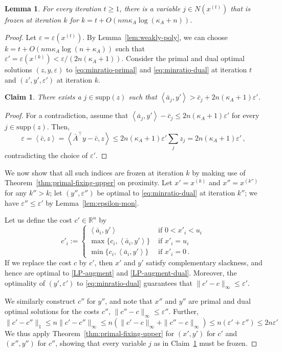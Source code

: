 \documentclass[11pt, a4paper]{article}
\newcommand{\pr}[2]{\left\langle #1, #2 \right\rangle}
\newcommand{\supp}{\mathrm{supp}}
\newcommand{\1}{\mathbbm{1}}
\newtheorem{lemma}[theorem]{Lemma}
\newtheorem{claim}{Claim}[theorem]
\theoremstyle{case}
\newcommand{\R}{\mathbb{R}}
\begin{document}
\begin{lemma}
For every iteration $t\ge 1$, there is a variable $j\in  N(x^{(t)})$ that is frozen at iteration $k$ for $k=t+O(nm\kappa_A\log(\kappa_A+n))$.
\end{lemma}
\begin{proof}
Let $\varepsilon=\varepsilon(x^{(t)})$. By Lemma~\ref{lem:weakly-poly}, we can choose $k=t+O(nm\kappa_A\log(n+\kappa_A))$ such that $\varepsilon'=\varepsilon(x^{(k)})<\varepsilon/(2n(\kappa_A+1))$.
Consider the primal and dual optimal solutions $(z,y,\varepsilon)$ to \eqref{eq:minratio-primal} and \eqref{eq:minratio-dual}  at iteration $t$ and $(z',y',\varepsilon')$ at iteration $k$. 

\begin{claim}\label{cl:largeindex} There exists a $j\in \supp(z)$ such that $\pr{\bar a_j}{y'}>\bar c_j + 2n(\kappa_A+1)\varepsilon'$. 
\end{claim}
\begin{proof}
For a contradiction, assume that $\pr{\bar a_j}{y'}-\bar c_j\le 2n(\kappa_A+1)\varepsilon'$ for every $j\in \supp(z)$.
 Then,
\[
\varepsilon= \pr{\bar c}{z}=\pr{\bar A^\top y -\bar c}{z} \le 2n(\kappa_A+1)\varepsilon'\sum_j z_j= 2n(\kappa_A+1)\varepsilon'\, , 
\]
contradicting the choice of $\varepsilon'$.
\end{proof}
We now show that all such indices are frozen at iteration $k$ by making use of Theorem~\ref{thm:primal-fixing-upper} on proximity. 
Let $x'=x^{(k)}$ and $x''=x^{(k'')}$ for any $k''>k$; let $(y'',\varepsilon'')$ be optimal to  \eqref{eq:minratio-dual} at iteration $k''$; we have $\varepsilon''\le\varepsilon'$ by Lemma~\ref{lem:epsilon-mon}.

Let us define the cost $c'\in\R^{n}$ by 
\[
c'_i:=\begin{cases}
\pr{\bar a_i}{y'}&\mbox{ if }0<x'_i<u_i\, \\
\max\{c_i, \pr{\bar a_i}{y'}\}&\mbox{ if }x'_i=u_i\, \\ 
\min\{c_i, \pr{\bar a_i}{y'}\}&\mbox{ if }x'_i=0\,.
\end{cases}
\]
If we replace the cost $c$ by $c'$, then  $x'$ and $y'$ satisfy complementary slackness, and hence are optimal to \ref{LP-augment} and \eqref{LP-augment-dual}. Moreover, the optimality of $(y',\varepsilon')$ to \eqref{eq:minratio-dual} guarantees that $\|c'-c\|_\infty\le \varepsilon'$.

We similarly construct $c''$ for $y''$, and note that $x''$ and $y''$ are primal and dual optimal solutions for the costs $c''$, $\|c''-c\|_\infty\le \varepsilon''$.  Further,
\[
\|c'-c''\|_1\le n\|c'-c''\|_\infty\le n\left(\|c'-c\|_\infty+\|c''-c\|_\infty\right)\le n(\varepsilon'+\varepsilon'')\le 2n\varepsilon'
\]
We thus apply Theorem~\ref{thm:primal-fixing-upper} for $(x',y')$ for $c'$ and $(x'',y'')$ for $c''$, showing that every variable $j$ as in Claim~\ref{cl:largeindex} must be frozen.
\end{proof}
\end{document}
